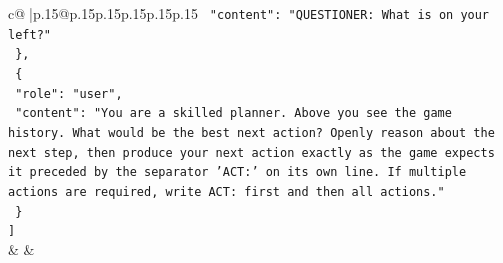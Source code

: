 \documentclass{article}
\begin{document}
{\begin{supertabular}{c@{$\;$}|p{.15\linewidth}@{}p{.15\linewidth}p{.15\linewidth}p{.15\linewidth}p{.15\linewidth}p{.15\linewidth}}
{{{\texttt{    "content": "QUESTIONER: What is on your left?"} \\
\texttt{  \},} \\
\texttt{  \{} \\
\texttt{    "role": "user",} \\
\texttt{    "content": "You are a skilled planner. Above you see the game history. What would be the best next action? Openly reason about the next step, then produce your next action exactly as the game expects it preceded by the separator 'ACT:' on its own line. If multiple actions are required, write ACT: first and then all actions."} \\
\texttt{  \}} \\
\texttt{{]}} \\
            }
        }
    }
    & & \\ \\


\end{supertabular}}
\end{document}
